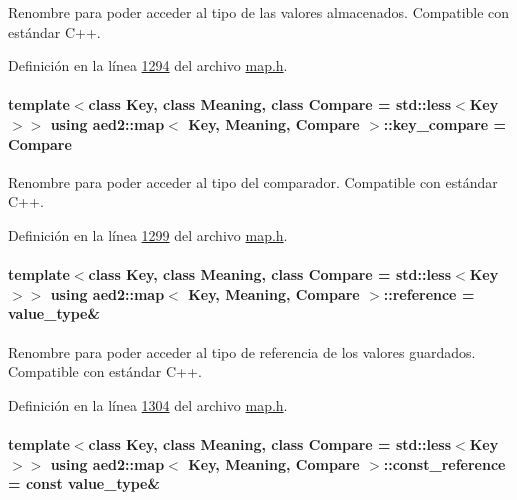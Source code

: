 Renombre para poder acceder al tipo de las valores almacenados. Compatible con estándar C++. 



Definición en la línea \hyperlink{map_8h_source_l01294}{1294} del archivo \hyperlink{map_8h_source}{map.\-h}.

\hypertarget{classaed2_1_1map_a3efa081d3379ab76f33a5ef9fe697523_a3efa081d3379ab76f33a5ef9fe697523}{
\paragraph[{key\-\_\-compare}]{\setlength{\rightskip}{0pt plus 5cm}template$<$class Key, class Meaning, class Compare = std\-::less$<$\-Key$>$$>$ using {\bf aed2\-::map}$<$ Key, Meaning, Compare $>$\-::{\bf key\-\_\-compare} =  Compare}}\label{classaed2_1_1map_a3efa081d3379ab76f33a5ef9fe697523_a3efa081d3379ab76f33a5ef9fe697523}


Renombre para poder acceder al tipo del comparador. Compatible con estándar C++. 



Definición en la línea \hyperlink{map_8h_source_l01299}{1299} del archivo \hyperlink{map_8h_source}{map.\-h}.

\hypertarget{classaed2_1_1map_af4f147533b3c0207ab036c86ce13ec0d_af4f147533b3c0207ab036c86ce13ec0d}{
\paragraph[{reference}]{\setlength{\rightskip}{0pt plus 5cm}template$<$class Key, class Meaning, class Compare = std\-::less$<$\-Key$>$$>$ using {\bf aed2\-::map}$<$ Key, Meaning, Compare $>$\-::{\bf reference} =  {\bf value\-\_\-type}\&}}\label{classaed2_1_1map_af4f147533b3c0207ab036c86ce13ec0d_af4f147533b3c0207ab036c86ce13ec0d}


Renombre para poder acceder al tipo de referencia de los valores guardados. Compatible con estándar C++. 



Definición en la línea \hyperlink{map_8h_source_l01304}{1304} del archivo \hyperlink{map_8h_source}{map.\-h}.

\hypertarget{classaed2_1_1map_a277080d3db76f19df9319ecba16475a9_a277080d3db76f19df9319ecba16475a9}{
\paragraph[{const\-\_\-reference}]{\setlength{\rightskip}{0pt plus 5cm}template$<$class Key, class Meaning, class Compare = std\-::less$<$\-Key$>$$>$ using {\bf aed2\-::map}$<$ Key, Meaning, Compare $>$\-::{\bf const\-\_\-reference} =  const {\bf value\-\_\-type}\&}}\label{classaed2_1_1map_a277080d3db76f19df9319ecba16475a9_a277080d3db76f19df9319ecba16475a9}


